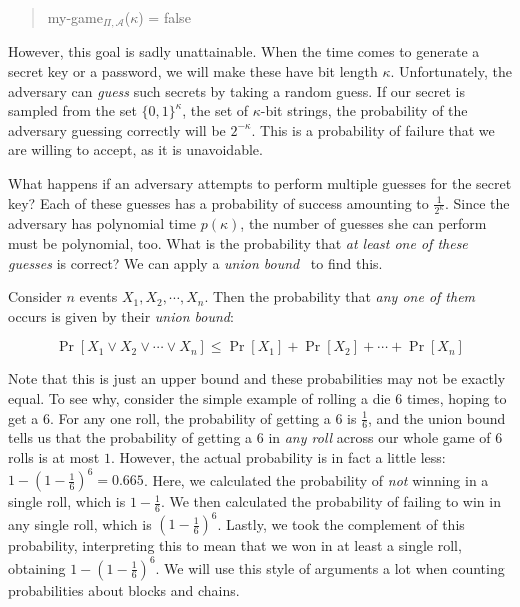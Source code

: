 \begin{quote}
  \textsf{my-game}$_{\Pi,\mathcal{A}}$($\kappa$) = \textsf{false}
\end{quote}

However, this goal is sadly unattainable. When the time comes to generate a secret
key or a password, we will make these have bit length $\kappa$. Unfortunately, the adversary
can \emph{guess} such secrets by taking a random guess. If our secret is sampled from the
set $\{0, 1\}^\kappa$, the set of $\kappa$-bit strings, the probability of the adversary
guessing correctly will be $2^{-\kappa}$. This is a probability of failure that we are
willing to accept, as it is unavoidable.

What happens if an adversary attempts to perform multiple guesses for the secret key?
Each of these guesses has a probability of success amounting to $\frac{1}{2^\kappa}$.
Since the adversary has polynomial time $p(\kappa)$, the number of guesses she can
perform must be polynomial, too. What is the probability that \emph{at least one of
these guesses} is correct? We can apply a \emph{union bound}~\cite{ross} to find this.

\begin{theorem}
  Consider $n$ events $X_1, X_2, \cdots, X_n$. Then the probability
  that \emph{any one of them} occurs is given by their \emph{union bound}:

  \[
    \Pr[X_1 \lor X_2 \lor \cdots \lor X_n] \leq \Pr[X_1] + \Pr[X_2] + \cdots + \Pr[X_n]
  \]
\end{theorem}

Note that this is just an upper bound and these probabilities may not be exactly
equal. To see why, consider the simple example of rolling a die $6$ times, hoping
to get a $6$. For any one roll, the probability of getting a $6$ is $\frac{1}{6}$,
and the union bound tells us that the probability of getting a $6$ in \emph{any
roll} across our whole game of $6$ rolls is at most $1$. However, the actual probability
is in fact a little less: $1 - (1 - \frac{1}{6})^6 = 0.665$. Here, we calculated
the probability of \emph{not} winning in a single roll, which is $1 - \frac{1}{6}$.
We then calculated the probability of failing to win in any single roll, which is
$(1 - \frac{1}{6})^6$. Lastly, we took the complement of this probability, interpreting
this to mean that we won in at least a single roll, obtaining $1 - (1 - \frac{1}{6})^6$.
We will use this style of arguments a lot when counting probabilities about blocks
and chains.

